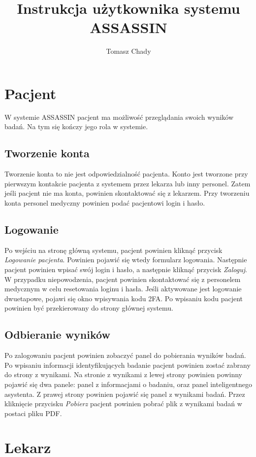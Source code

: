 \documentclass{documentation}
\title{Instrukcja użytkownika systemu ASSASSIN}
\author{Tomasz Chady}
\begin{document}
\maketitle

\tableofcontents

\section{Pacjent}

W systemie ASSASSIN pacjent ma możliwość przeglądania swoich wyników badań.
Na tym się kończy jego rola w systemie.

\subsection{Tworzenie konta}

Tworzenie konta to nie jest odpowiedzialność pacjenta.
Konto jest tworzone przy pierwszym kontakcie pacjenta z systemem przez lekarza lub inny personel.
Zatem jeśli pacjent nie ma konta, powinien skontaktować się z lekarzem.
Przy tworzeniu konta personel medyczny powinien podać pacjentowi login i hasło.

\subsection{Logowanie}

Po wejściu na stronę główną systemu, pacjent powinien kliknąć przycisk \textit{Logowanie pacjenta}.
Powinien pojawić się wtedy formularz logowania.
Następnie pacjent powinien wpisać swój login i hasło, a następnie kliknąć przycisk \textit{Zaloguj}.
W przypadku niepowodzenia, pacjent powinien skontaktować się z personelem medycznym w celu resetowania loginu i hasła.
Jeśli aktywowane jest logowanie dwuetapowe, pojawi się okno wpisywania kodu 2FA.
Po wpisaniu kodu pacjent powinien być przekierowany do strony głównej systemu.

\subsection{Odbieranie wyników}

Po zalogowaniu pacjent powinien zobaczyć panel do pobierania wyników badań.
Po wpisaniu informacji identyfikujących badanie pacjent powinien zostać zabrany do strony z wynikami.
Na stronie z wynikami z lewej strony powinien powinny pojawić się dwa panele: panel z informacjami o badaniu, oraz panel inteligentnego asystenta.
Z prawej strony powinien pojawić się panel z wynikami badań.
Przez kliknięcie przycisku \textit{Pobierz} pacjent powinien pobrać plik z wynikami badań w postaci pliku PDF.

\section{Lekarz}
\end{document}
